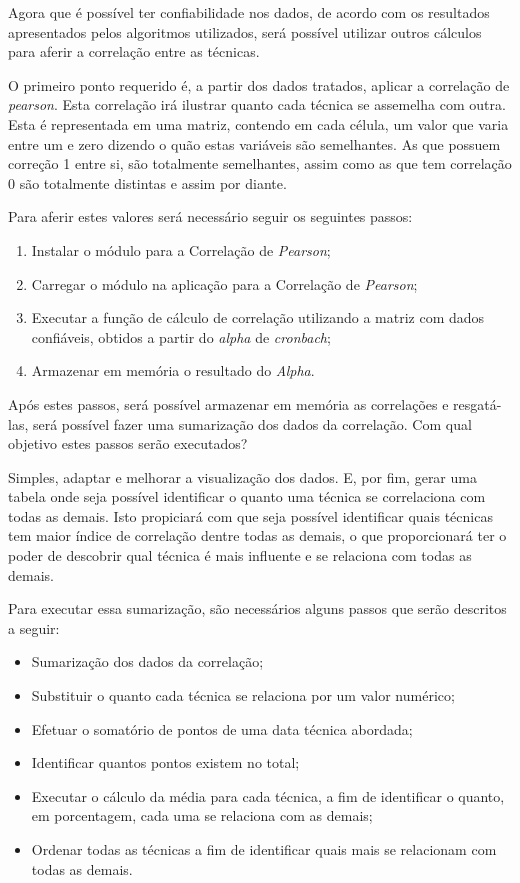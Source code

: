 Agora que é possível ter confiabilidade nos dados, de acordo com os resultados apresentados pelos algoritmos utilizados, será
possível
utilizar outros cálculos para aferir a correlação entre as técnicas.

O primeiro ponto requerido é, a partir dos dados tratados, aplicar a correlação de \textit{pearson}. Esta correlação irá ilustrar
quanto cada técnica se assemelha com outra. Esta é representada em uma matriz, contendo em cada célula, um valor que varia entre um
e zero dizendo o quão estas variáveis são semelhantes. As que possuem correção 1 entre si, são totalmente semelhantes, assim como as que tem
correlação 0 são totalmente distintas e assim por diante.

Para aferir estes valores será necessário seguir os seguintes passos:

\begin{enumerate}
    \item Instalar o módulo para a Correlação de \textit{Pearson};
    \item Carregar o módulo  na aplicação para a Correlação de \textit{Pearson};
    \item Executar a função de cálculo de correlação utilizando a matriz com dados confiáveis, obtidos a partir do \textit{alpha} de \textit{cronbach};
    \item Armazenar em memória o resultado do \textit{Alpha}.
\end{enumerate}

Após estes passos, será possível armazenar em memória as correlações e resgatá-las, será possível fazer uma sumarização dos dados
da correlação. Com qual objetivo estes passos serão executados?

Simples, adaptar e melhorar a visualização dos dados. E, por fim, gerar uma tabela onde seja possível identificar o quanto uma técnica
se correlaciona com todas as demais. Isto propiciará com que seja possível identificar quais técnicas tem maior índice de correlação
dentre todas as demais, o que proporcionará ter o poder de descobrir qual técnica é mais influente e se relaciona com todas as demais.


Para executar essa sumarização, são necessários alguns passos que serão descritos a seguir:

\begin{itemize}
    \item Sumarização dos dados da correlação;
    \item Substituir o quanto cada técnica se relaciona por um valor numérico;
    \item Efetuar o somatório de pontos de uma data técnica abordada;
    \item Identificar quantos pontos existem no total;
    \item Executar o cálculo da média para cada técnica, a fim de identificar o quanto, em porcentagem, cada uma
        se relaciona com as demais;
    \item Ordenar todas as técnicas a fim de identificar quais mais se relacionam com todas as demais.
\end{itemize}

